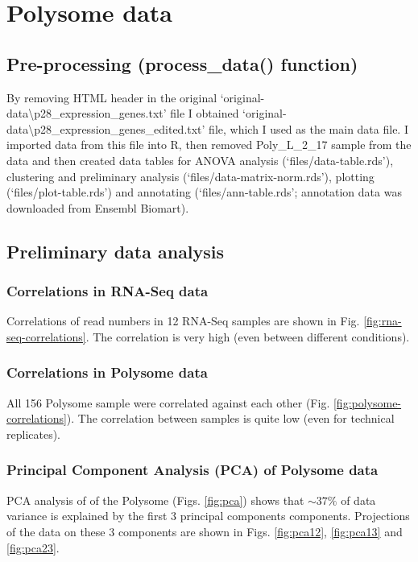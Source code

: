 \documentclass[12pt]{article} %
\begin{document}
\newpage %


\section{Polysome data} %

\subsection{Pre-processing (process\_data() function)} %
By removing HTML header in the original `original-data\textbackslash p28\_expression\_genes.txt' file I obtained `original-data\textbackslash p28\_expression\_genes\_edited.txt' file, which I used as the main data file. I imported data from this file into R, then removed Poly\_L\_2\_17 sample from the data and then created data tables for ANOVA analysis (`files/data-table.rds'), clustering and preliminary analysis (`files/data-matrix-norm.rds'), plotting (`files/plot-table.rds') and annotating (`files/ann-table.rds'; annotation data was downloaded from Ensembl Biomart).

\subsection{Preliminary data analysis}

\subsubsection{Correlations in RNA-Seq data}
Correlations of read numbers in 12 RNA-Seq samples are shown in Fig. \ref{fig:rna-seq-correlations}. The correlation is very high (even between different conditions).

\subsubsection{Correlations in Polysome data}
All 156 Polysome sample were correlated against each other (Fig. \ref{fig:polysome-correlations}). The correlation between samples is quite low (even for technical replicates).

\subsubsection{Principal Component Analysis (PCA) of Polysome data}
PCA analysis of of the Polysome (Figs. \ref{fig:pca}) shows that \(\sim 37\%\) of data variance is explained by the first 3 principal components components. Projections of the data on these 3 components are shown in Figs. \ref{fig:pca12}, \ref{fig:pca13} and \ref{fig:pca23}.
\end{document}
